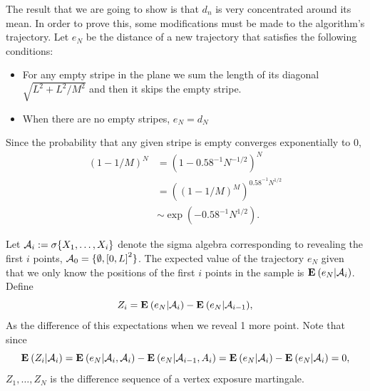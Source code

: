 The result that we are going to show is that $d_n$ is very concentrated around its mean. In order to prove this, some modifications must be made to the algorithm's trajectory. Let $e_N$ be the distance of a new trajectory that satisfies the following conditions:
\begin{itemize}
    \item For any empty stripe in the plane we sum the length of its diagonal $\sqrt{L^2+ L^2/M^2}$ and then it skips the empty stripe.
    \item When there are no empty stripes, $e_N = d_N$ 
\end{itemize}
 Since the probability that any given stripe is empty converges exponentially to 0,
\[ \begin{array}{rl}
    {(1- 1/M)}^N & = {(1- 0.58^{-1} N^{-1/2})}^N\\[1em]
    & = {\left({(1- 1/M)}^{M}\right)}^{0.58^{-1} N^{1/2}}\\[1em]
    &  \sim \exp(-0.58^{-1} N^{1/2}).
\end{array} \] 


Let $\mathcal{A}_i := \sigma\{X_1,\ldots,X_i\}$ denote the sigma algebra corresponding to revealing the first $i$ points, $\mathcal{A}_0 = \{\emptyset, {[0,L]}^2\}$. The expected value of the trajectory $e_N$ given that we only know the positions of the first $i$ points in the sample is $\mathbf{E}\: (e_N | \mathcal{A}_i)$. Define
\[ Z_i = \mathbf{E}\: (e_N | \mathcal{A}_i) - \mathbf{E}\: (e_N | \mathcal{A}_{i-1}),  \]  
As the difference of this expectations when we reveal 1 more point. Note that since
\[ \mathbf{E}\:(Z_i | \mathcal{A}_i) =  \mathbf{E}\: (e_N | \mathcal{A}_i, \mathcal{A}_i) - \mathbf{E}\: (e_N | \mathcal{A}_{i-1}, A_i) = \mathbf{E}\: (e_N | \mathcal{A}_i) - \mathbf{E}\: (e_N | \mathcal{A}_i) = 0,\] 
$Z_1, \ldots, Z_N$ is the difference sequence of a vertex exposure martingale.

